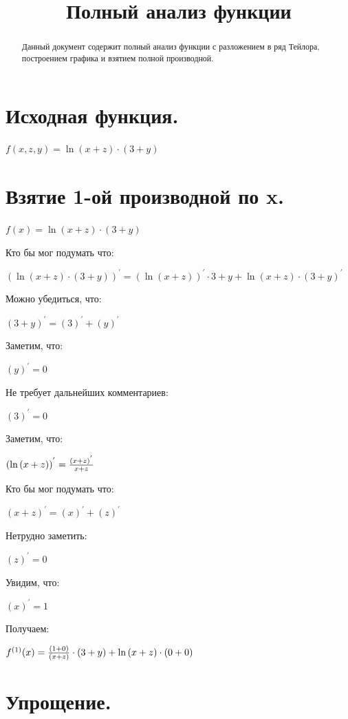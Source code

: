 \documentclass{article}
\title{Полный анализ функции}
\begin{document}
\maketitle
\renewcommand{\abstractname}{Введение}\begin{abstract}Данный документ содержит полный анализ функции с разложением в ряд Тейлора, построением графика и взятием полной производной.\end{abstract}
\section*{Исходная функция.}

$f(x, z, y) = {{\ln{({x} + {z})}} \cdot {({3} + {y})}}$

\section{Взятие 1-ой производной по x.}

$ f(x) = {{\ln{({x} + {z})}} \cdot {({3} + {y})}}$

Кто бы мог подумать что:

${({{\ln{({x} + {z})}} \cdot {({3} + {y})}})}^{'} = {({\ln{({x} + {z})}})}^{'}\cdot {{3} + {y}} + {\ln{({x} + {z})}}\cdot {({{3} + {y}})}^{'}$

Можно убедиться, что:

${({{3} + {y}})}^{'} = {({3})}^{'} + {({y})}^{'}$

Заметим, что:

${({y})}^{'} = 0$

Не требует дальнейших комментариев:

${({3})}^{'} = 0$

Заметим, что:

${({\ln{({x} + {z})}})}^{'} = {{{({{x} + {z}})}^{'} } \over {{{x} + {z}}}}$

Кто бы мог подумать что:

${({{x} + {z}})}^{'} = {({x})}^{'} + {({z})}^{'}$

Нетрудно заметить:

${({z})}^{'} = 0$

Увидим, что:

${({x})}^{'} = 1$

Получаем:

$ f^{(1)}(x) = {{{{({1} + {0})} \over {({x} + {z})}} \cdot {({3} + {y})}} + {{\ln{({x} + {z})}} \cdot {({0} + {0})}}}$

\section{Упрощение.}
\end{document}

